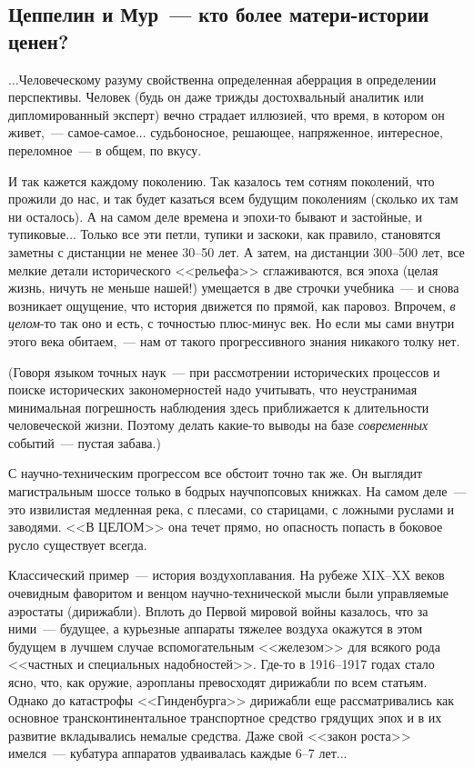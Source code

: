\documentclass{scrbook}
\newcommand{\flqq}{<<}
\newcommand{\frqq}{>>}
\newcommand{\mdash}{~--- }
\newcommand{\ndash}{--}
\newcommand{\commamdash}{~--- } %
\newcommand{\essaysection}[1]{\subsection*{#1}\nopagebreak}
\begin{document}
\essaysection{Цеппелин и Мур{\mdash}кто более матери-истории ценен?}

...Человеческому разуму свойственна определенная аберрация в определении перспективы. Человек (будь он даже трижды достохвальный аналитик или дипломированный эксперт) вечно страдает иллюзией, что время, в котором он живет,{\commamdash}самое-самое... судьбоносное, решающее, напряженное, интересное, переломное{\mdash}в общем, по вкусу.

И так кажется каждому поколению. Так казалось тем сотням поколений, что прожили до нас, и так будет казаться всем будущим поколениям (сколько их там ни осталось). А на самом деле времена и эпохи-то бывают и застойные, и тупиковые... Только все эти петли, тупики и заскоки, как правило, становятся заметны с дистанции не менее 30{\ndash}50 лет. А затем, на дистанции 300{\ndash}500 лет, все мелкие детали исторического {\flqq}рельефа{\frqq} сглаживаются, вся эпоха (целая жизнь, ничуть не меньше нашей!) умещается в две строчки учебника{\mdash}и снова возникает ощущение, что история движется по прямой, как паровоз. Впрочем, \emph{в целом}-то так оно и есть, с точностью плюс-минус век. Но если мы сами внутри этого века обитаем,{\commamdash}нам от такого прогрессивного знания никакого толку нет.

(Говоря языком точных наук{\mdash}при рассмотрении исторических процессов и поиске исторических закономерностей надо учитывать, что неустранимая минимальная погрешность наблюдения здесь приближается к длительности человеческой жизни. Поэтому делать какие-то выводы на базе \emph{современных} событий{\mdash}пустая забава.)

С научно-техническим прогрессом все обстоит точно так же. Он выглядит магистральным шоссе только в бодрых научпопсовых книжках. На самом деле{\mdash}это извилистая медленная река, с плесами, со старицами, с ложными руслами и заводями. {\flqq}В ЦЕЛОМ{\frqq} она течет прямо, но опасность попасть в боковое русло существует всегда.

Классический пример{\mdash}история воздухоплавания. На рубеже XIX{\ndash}XX веков очевидным фаворитом и венцом научно-технической мысли были управляемые аэростаты (дирижабли). Вплоть до Первой мировой войны казалось, что за ними{\mdash}будущее, а курьезные аппараты тяжелее воздуха окажутся в этом будущем в лучшем случае вспомогательным {\flqq}железом{\frqq} для всякого рода {\flqq}частных и специальных надобностей{\frqq}. Где-то в 1916{\ndash}1917 годах стало ясно, что, как оружие, аэропланы превосходят дирижабли по всем статьям. Однако до катастрофы {\flqq}Гинденбурга{\frqq} дирижабли еще рассматривались как основное трансконтинентальное транспортное средство грядущих эпох и в их развитие вкладывались немалые средства. Даже свой {\flqq}закон роста{\frqq} имелся{\mdash}кубатура аппаратов удваивалась каждые 6{\ndash}7 лет...
\end{document}

